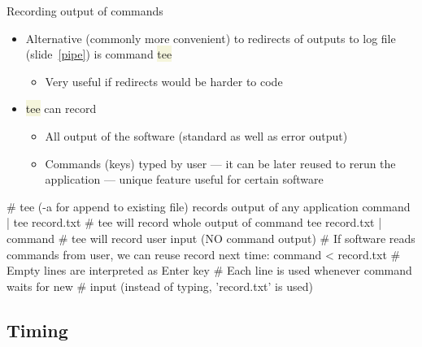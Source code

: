 \documentclass[compress, xelatex, 11pt, xcolor=svgnames, aspectratio=169, url={hyphens, lowtilde}]{beamer}
\renewcommand{\texttt}[1]{\colorbox{Beige}{{\ttfamily #1}}}
\begin{document}
\begin{frame}[fragile]{Recording output of commands}
	\begin{itemize}
		\item Alternative (commonly more convenient) to redirects of outputs to log file (slide~\ref{pipe}) is command \texttt{tee}
		\begin{itemize}
			\item Very useful if redirects would be harder to code
		\end{itemize}
		\item \texttt{tee} can record
		\begin{itemize}
			\item All output of the software (standard as well as error output)
			\item Commands (keys) typed by user --- it can be later reused to rerun the application --- unique feature useful for certain software
		\end{itemize}
	\end{itemize}
	\vfill
	\begin{bashcode}
    # tee (-a for append to existing file) records output of any application
    command | tee record.txt # tee will record whole output of command
    tee record.txt | command # tee will record user input (NO command output)
    # If software reads commands from user, we can reuse record next time:
    command < record.txt # Empty lines are interpreted as Enter key
                         # Each line is used whenever command waits for new
                         # input (instead of typing, 'record.txt' is used)
	\end{bashcode}
\end{frame}

\subsection{Timing}
\end{document}

